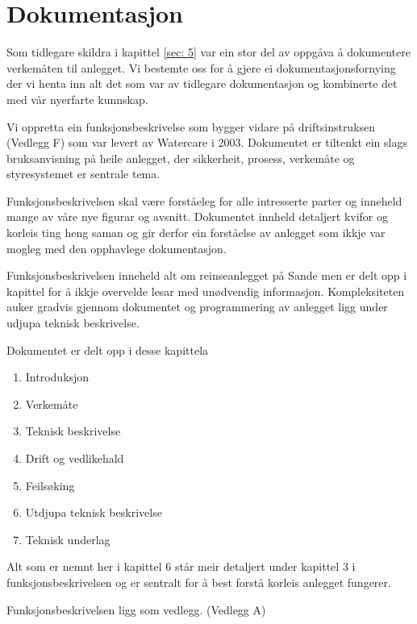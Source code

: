 \newpage
\section{Dokumentasjon}
\thispagestyle{fancy}

Som tidlegare skildra i kapittel \ref{sec: 5} var ein stor del av oppgåva å dokumentere
verkemåten til anlegget. Vi bestemte oss for å gjere ei dokumentasjonsfornying
der vi henta inn alt det som var av tidlegare dokumentasjon og kombinerte det med vår nyerfarte kunnskap.

Vi oppretta ein funksjonsbeskrivelse som bygger vidare på driftsinstruksen (Vedlegg F) som var levert av 
Watercare i 2003. Dokumentet er tiltenkt ein slags bruksanvisning på heile anlegget,
der sikkerheit, prosess, verkemåte og styresystemet er sentrale tema.

Funksjonsbeskrivelsen skal være forståeleg for alle intresserte parter og inneheld 
mange av våre nye figurar og avsnitt. Dokumentet innheld detaljert kvifor og korleis
ting heng saman og gir derfor ein forståelse av anlegget som ikkje var mogleg med den opphavlege dokumentasjon.

Funksjonsbeskrivelsen inneheld alt om reinseanlegget på Sande men er delt opp i kapittel for å ikkje
overvelde lesar med unødvendig informasjon. Kompleksiteten auker gradvis gjennom dokumentet
og programmering av anlegget ligg under udjupa teknisk beskrivelse.

Dokumentet er delt opp i desse kapittela

\begin{enumerate}
    \item Introduksjon
    \item Verkemåte
    \item Teknisk beskrivelse
    \item Drift og vedlikehald
    \item Feilsøking
    \item Utdjupa teknisk beskrivelse
    \item Teknisk underlag
\end{enumerate}

Alt som er nemnt her i kapittel 6 står meir detaljert under kapittel 3 i funksjonsbeskrivelsen og
er sentralt for å best forstå korleis anlegget fungerer.

Funksjonsbeskrivelsen ligg som vedlegg. (Vedlegg A)